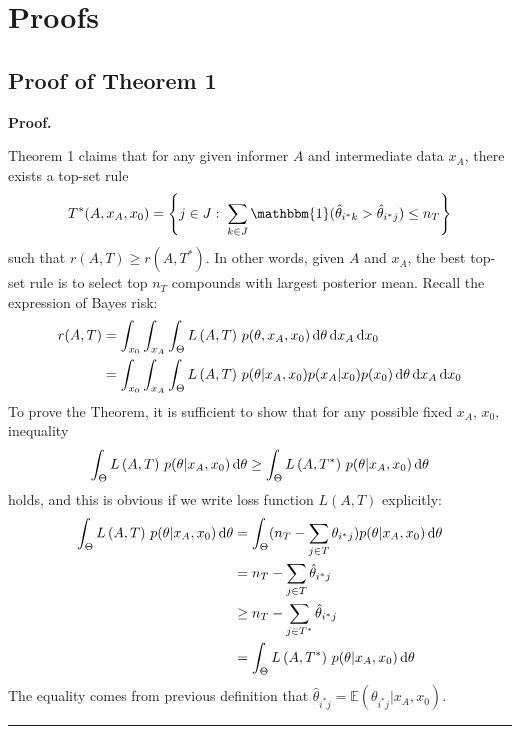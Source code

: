 \documentclass[12pt]{article}
\newenvironment{proof}[1][Proof]{\noindent\textbf{#1.} }{\ \rule{0.5em}{0.5em}}
\begin{document}
%
%

\appendix 

\section{Proofs}
\subsection{Proof of Theorem 1}
\begin{proof}

Theorem 1 claims that for any given informer $A$ and intermediate data $x_A$, there exists a top-set rule 
\begin{eqnarray*}
T^*(A,x_A,x_0) = \left\{ j \in J: \; \sum_{k\in J} \mathbbm{1}(\hat \theta_{i^*k} > \hat \theta_{i^*j}) \leq n_T \right\}
\end{eqnarray*}
such that  $r(A,T) \geq r(A, T^*)$. In other words, given $A$ and $x_A$, the best top-set rule is to select top $n_T$ compounds with largest posterior mean. Recall the expression of Bayes risk: 
\begin{align*}
r(A, T) 
&= \int_{x_0} \int_{x_A} \int_\Theta  L\left( A, T \right) \, 
p(\theta, x_A,x_0)\, {\rm d}\theta \, {\rm d} x_A \, {\rm d} x_0\\
&= \int_{x_0} \int_{x_A} \int_\Theta  L\left( A, T \right) \, 
p(\theta |x_A,x_0)p(x_A|x_0)p(x_0)\, {\rm d}\theta \, {\rm d} x_A \, {\rm d} x_0
\end{align*}
To prove the Theorem, it is sufficient to show that for any possible fixed $x_A$, $x_0$, inequality 
\begin{eqnarray}
\label{eq:inequal1}
\int_\Theta  L\left( A, T \right) \, 
p(\theta |x_A,x_0) \, {\rm d}\theta \geq \int_\Theta  L\left( A, T^* \right) \, 
p(\theta |x_A,x_0) \, {\rm d}\theta
\end{eqnarray}holds, and this is obvious if we write loss function $L(A,T)$ explicitly:
\begin{align*}
\int_\Theta  L\left( A, T \right) \, p(\theta |x_A,x_0) \, {\rm d}\theta &= \int_\Theta  ( n_T - \sum_{j\in T} \theta_{i^*j}) 
p(\theta |x_A,x_0) \, {\rm d}\theta\\
&= n_T - \sum_{j\in T} \hat \theta_{i^*j}\\
&\geq n_T - \sum_{j\in T^*}  \hat \theta_{i^*j}\\
&= \int_\Theta  L\left( A, T^* \right) \, 
p(\theta |x_A,x_0) \, {\rm d}\theta
\end{align*}
The equality comes from previous definition that $\hat \theta_{i^*j} = \mathbb E(\theta_{i^*j}|x_A,x_0)$.
\end{proof}
\end{document}
